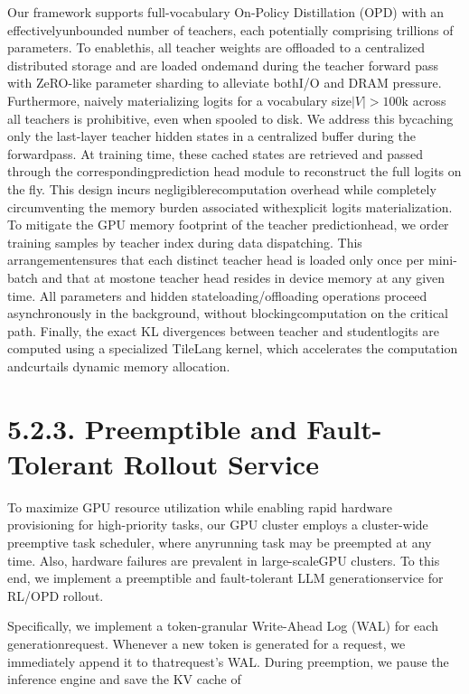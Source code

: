 \documentclass[
  10
]{article}
\begin{document}
Our framework supports full-vocabulary On-Policy Distillation (OPD) with
an effectivelyunbounded number of teachers, each potentially comprising
trillions of parameters. To enablethis, all teacher weights are
offloaded to a centralized distributed storage and are loaded ondemand
during the teacher forward pass with ZeRO-like parameter sharding to
alleviate bothI/O and DRAM pressure. Furthermore, naively materializing
logits for a vocabulary size\(\vert V \vert > 1 0 0 \mathrm { k }\)
across all teachers is prohibitive, even when spooled to disk. We
address this bycaching only the last-layer teacher hidden states in a
centralized buffer during the forwardpass. At training time, these
cached states are retrieved and passed through the
correspondingprediction head module to reconstruct the full logits on
the fly. This design incurs negligiblerecomputation overhead while
completely circumventing the memory burden associated withexplicit
logits materialization. To mitigate the GPU memory footprint of the
teacher predictionhead, we order training samples by teacher index
during data dispatching. This arrangementensures that each distinct
teacher head is loaded only once per mini-batch and that at mostone
teacher head resides in device memory at any given time. All parameters
and hidden stateloading/offloading operations proceed asynchronously in
the background, without blockingcomputation on the critical path.
Finally, the exact KL divergences between teacher and studentlogits are
computed using a specialized TileLang kernel, which accelerates the
computation andcurtails dynamic memory allocation.

\section{5.2.3. Preemptible and Fault-Tolerant Rollout
Service}\label{preemptible-and-fault-tolerant-rollout-service}

To maximize GPU resource utilization while enabling rapid hardware
provisioning for high-priority tasks, our GPU cluster employs a
cluster-wide preemptive task scheduler, where anyrunning task may be
preempted at any time. Also, hardware failures are prevalent in
large-scaleGPU clusters. To this end, we implement a preemptible and
fault-tolerant LLM generationservice for RL/OPD rollout.

Specifically, we implement a token-granular Write-Ahead Log (WAL) for
each generationrequest. Whenever a new token is generated for a request,
we immediately append it to thatrequest's WAL. During preemption, we
pause the inference engine and save the KV cache of
\end{document}
